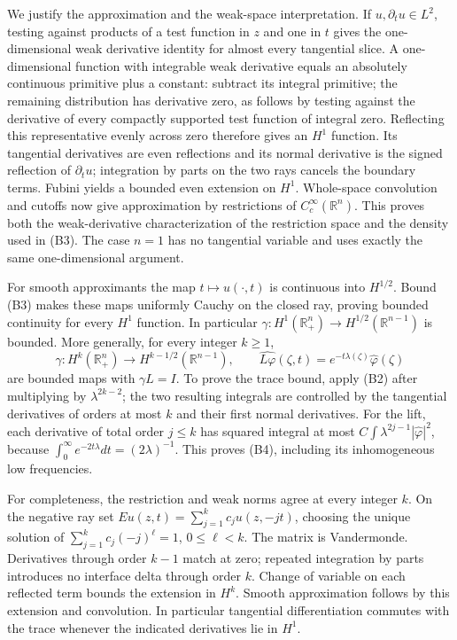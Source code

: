 \documentclass[
  11pt,
]{article}
\begin{document}
We justify the approximation and the weak-space interpretation. If
\(u,\partial_tu\in L^2\), testing against products of a test function in
\(z\) and one in \(t\) gives the one-dimensional weak derivative
identity for almost every tangential slice. A one-dimensional function
with integrable weak derivative equals an absolutely continuous
primitive plus a constant: subtract its integral primitive; the
remaining distribution has derivative zero, as follows by testing
against the derivative of every compactly supported test function of
integral zero. Reflecting this representative evenly across zero
therefore gives an \(H^1\) function. Its tangential derivatives are even
reflections and its normal derivative is the signed reflection of
\(\partial_tu\); integration by parts on the two rays cancels the
boundary terms. Fubini yields a bounded even extension on \(H^1\).
Whole-space convolution and cutoffs now give approximation by
restrictions of \(C_c^\infty(\mathbb R^n)\). This proves both the
weak-derivative characterization of the restriction space and the
density used in (B3). The case \(n=1\) has no tangential variable and
uses exactly the same one-dimensional argument.

For smooth approximants the map \(t\mapsto u(\cdot,t)\) is continuous
into \(H^{1/2}\). Bound (B3) makes these maps uniformly Cauchy on the
closed ray, proving bounded continuity for every \(H^1\) function. In
particular \(\gamma:H^1(\mathbb R^n_+)\to H^{1/2}(\mathbb R^{n-1})\) is
bounded. More generally, for every integer \(k\geq1\), \[
 \gamma:H^k(\mathbb R^n_+)\longrightarrow H^{k-1/2}(\mathbb R^{n-1}),
 \qquad \widehat{L\varphi}(\zeta,t)=e^{-t\lambda(\zeta)}\widehat\varphi(\zeta) \tag{B4}
\] are bounded maps with \(\gamma L=I\). To prove the trace bound, apply
(B2) after multiplying by \(\lambda^{2k-2}\); the two resulting
integrals are controlled by the tangential derivatives of orders at most
\(k\) and their first normal derivatives. For the lift, each derivative
of total order \(j\leq k\) has squared integral at most
\(C\int\lambda^{2j-1}|\widehat\varphi|^2\), because
\(\int_0^\infty e^{-2t\lambda}dt=(2\lambda)^{-1}\). This proves (B4),
including its inhomogeneous low frequencies.

For completeness, the restriction and weak norms agree at every integer
\(k\). On the negative ray set \(Eu(z,t)=\sum_{j=1}^{k}c_j u(z,-jt)\),
choosing the unique solution of \(\sum_{j=1}^{k}c_j(-j)^\ell=1\),
\(0\leq\ell<k\). The matrix is Vandermonde. Derivatives through order
\(k-1\) match at zero; repeated integration by parts introduces no
interface delta through order \(k\). Change of variable on each
reflected term bounds the extension in \(H^k\). Smooth approximation
follows by this extension and convolution. In particular tangential
differentiation commutes with the trace whenever the indicated
derivatives lie in \(H^1\).
\end{document}
